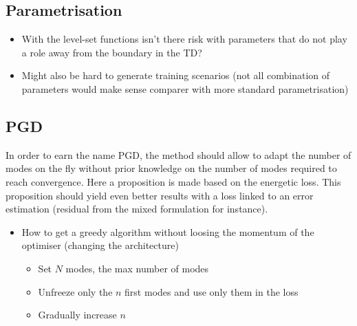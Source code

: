 \subsection{Parametrisation}

\begin{itemize}
	\item With the level-set functions isn't there risk with parameters that do not play a role away from the boundary in the TD?
	\item Might also be hard to generate training scenarios (not all combination of parameters would make sense comparer with more standard parametrisation)
\end{itemize}


\subsection{PGD}
In order to earn the name PGD, the method should allow to adapt the number of modes on the fly without prior knowledge on the number of modes required to reach convergence. Here a proposition is made based on the energetic loss. This proposition should yield even better results with a loss linked to an error estimation (residual from the mixed formulation for instance).
\begin{itemize}
	\item How to get a greedy algorithm without loosing the momentum of the optimiser (changing the architecture)
	\begin{itemize}
		\item Set $N$ modes, the max number of modes
		\item Unfreeze only the $n$ first modes and use only them in the loss
		\item Gradually increase $n$
	\end{itemize}
\end{itemize}




